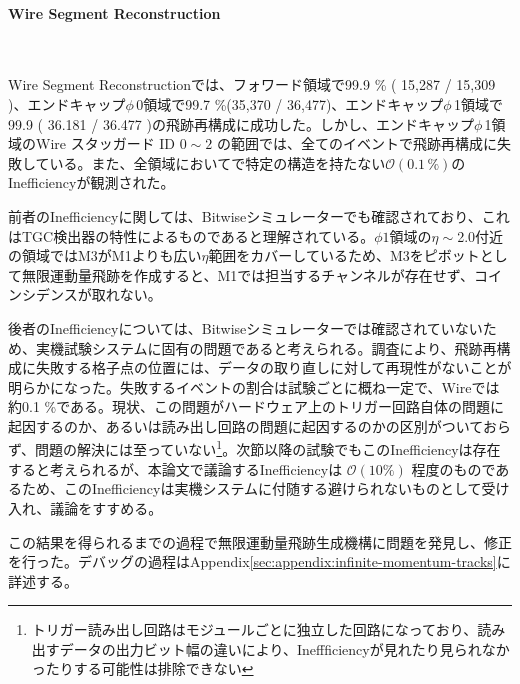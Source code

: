 \paragraph{Wire Segment Reconstruction}　　
\par
Wire Segment Reconstructionでは、フォワード領域で99.9 \% ( 15,287 / 15,309 )、エンドキャップ$\phi\,$0領域で99.7 \%(35,370 / 36,477)、エンドキャップ$\phi\,$1領域で99.9 ( 36.181 / 36.477 )の飛跡再構成に成功した。しかし、エンドキャップ$\phi\,$1領域のWire スタッガード ID $0 \sim 2$ の範囲では、全てのイベントで飛跡再構成に失敗している。また、全領域においてで特定の構造を持たない$\mathcal{O}(0.1\,\%)$のInefficiencyが観測された。

前者のInefficiencyに関しては、Bitwiseシミュレーターでも確認されており、これはTGC検出器の特性によるものであると理解されている。$\phi1$領域の$\eta\sim$2.0付近の領域ではM3がM1よりも広い$\eta$範囲をカバーしているため、M3をピボットとして無限運動量飛跡を作成すると、M1では担当するチャンネルが存在せず、コインシデンスが取れない。

後者のInefficiencyについては、Bitwiseシミュレーターでは確認されていないため、実機試験システムに固有の問題であると考えられる。調査により、飛跡再構成に失敗する格子点の位置には、データの取り直しに対して再現性がないことが明らかになった。失敗するイベントの割合は試験ごとに概ね一定で、Wireでは約0.1 \%である。現状、この問題がハードウェア上のトリガー回路自体の問題に起因するのか、あるいは読み出し回路の問題に起因するのかの区別がついておらず、問題の解決には至っていない\footnote{トリガー読み出し回路はモジュールごとに独立した回路になっており、読み出すデータの出力ビット幅の違いにより、Ineffficiencyが見れたり見られなかったりする可能性は排除できない}。次節以降の試験でもこのInefficiencyは存在すると考えられるが、本論文で議論するInefficiencyは $\mathcal{O}(10 \%)$ 程度のものであるため、このInefficiencyは実機システムに付随する避けられないものとして受け入れ、議論をすすめる。

この結果を得られるまでの過程で無限運動量飛跡生成機構に問題を発見し、修正を行った。デバッグの過程はAppendix\ref{sec:appendix:infinite-momentum-tracks}に詳述する。

